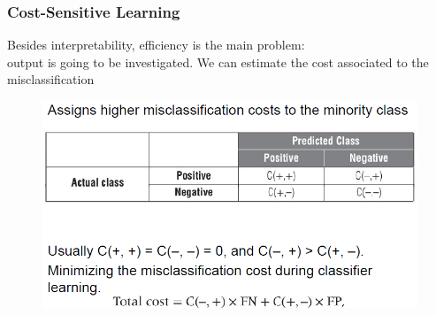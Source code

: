         \subsubsection{Cost-Sensitive Learning}
            Besides interpretability, efficiency is the main problem:\\
            output is going to be investigated. We can estimate the cost associated to the misclassification 
            \begin{figure}[ht!]
                \centering
                \includegraphics[width=0.6\linewidth]{lecture_16/last.png}
            \end{figure}